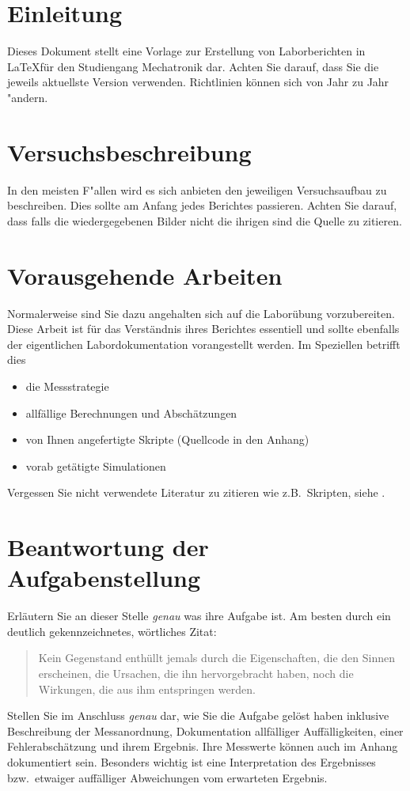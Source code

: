 \documentclass[a4paper, ngerman, oneside, 10pt]{article}
\begin{document}


\section{Einleitung}
Dieses Dokument stellt eine Vorlage zur Erstellung von Laborberichten in \LaTeX für den Studiengang Mechatronik dar. Achten Sie darauf, dass Sie die jeweils aktuellste Version verwenden. Richtlinien können sich von Jahr zu Jahr "andern.

\section{Versuchsbeschreibung}
In den meisten F"allen wird es sich anbieten den jeweiligen Versuchsaufbau zu beschreiben. Dies sollte am Anfang jedes Berichtes passieren. Achten Sie darauf, dass falls die wiedergegebenen Bilder nicht die ihrigen sind die Quelle zu zitieren.

\section{Vorausgehende Arbeiten}
Normalerweise sind Sie dazu angehalten sich auf die Laborübung vorzubereiten. Diese Arbeit ist für das Verständnis ihres Berichtes essentiell und sollte ebenfalls der eigentlichen Labordokumentation vorangestellt werden. Im Speziellen betrifft dies
\begin{itemize}
	\item die Messstrategie
	\item allfällige Berechnungen und Abschätzungen
	\item von Ihnen angefertigte Skripte (Quellcode in den Anhang)
	\item vorab getätigte Simulationen
\end{itemize}
Vergessen Sie nicht verwendete Literatur zu zitieren wie z.B.~Skripten, siehe \cite{meh10}.

\section{Beantwortung der Aufgabenstellung}
Erläutern Sie an dieser Stelle \emph{genau} was ihre Aufgabe ist. Am besten durch ein deutlich gekennzeichnetes, wörtliches Zitat:
\begin{quote}
	Kein Gegenstand enthüllt jemals durch die Eigenschaften, die den Sinnen erscheinen, die Ursachen, die ihn hervorgebracht haben, noch die Wirkungen, die aus ihm entspringen werden.
\end{quote}
Stellen Sie im Anschluss \emph{genau} dar, wie Sie die Aufgabe gelöst haben inklusive Beschreibung der Messanordnung, Dokumentation allfälliger Auffälligkeiten, einer Fehlerabschätzung und ihrem Ergebnis. Ihre Messwerte können auch im Anhang dokumentiert sein. Besonders wichtig ist eine Interpretation des Ergebnisses bzw.~etwaiger auffälliger Abweichungen vom erwarteten Ergebnis.
\end{document}
